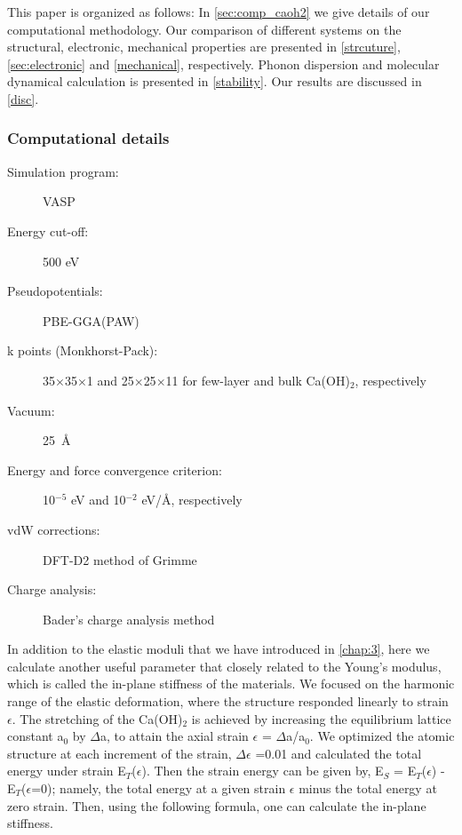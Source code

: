 This paper is organized as follows: In \autoref{sec:comp_caoh2} we 
give details of our computational methodology. Our comparison of different systems on the structural, electronic, mechanical properties are presented in \autoref{strcuture}, \autoref{sec:electronic} and \autoref{mechanical}, respectively.  Phonon dispersion and molecular dynamical calculation is presented in \autoref{stability}. Our results are discussed in \autoref{disc}.

               


\subsubsection{Computational details}

\begin{footnotesize}
\begin{description}
\item[Simulation program:] VASP
\item[Energy cut-off:] 500 eV
\item[Pseudopotentials:] PBE-GGA(PAW)
\item[k points (Monkhorst-Pack):] 35$\times$35$\times$1 and 25$\times$25$\times$11 for few-layer and bulk Ca(OH)$_{2}$, respectively 
\item[Vacuum:] 25~\AA
\item[Energy and force convergence criterion:] 10$^{-5}$ eV and 10$^{-2}$ eV/\AA, respectively
\item[vdW corrections:] DFT-D2 method of Grimme \cite{Grimme}
\item[Charge analysis:] Bader's charge analysis method\cite{Bader1,Bader2,Bader3}
\end{description}
\end{footnotesize}


In addition to the elastic moduli that we have introduced in \autoref{chap:3}, here we calculate another useful parameter that closely related to the Young's modulus, which is called the in-plane stiffness of the materials. We 
focused on the harmonic range of the elastic deformation, where the structure 
responded linearly to strain $\epsilon$. The stretching of the Ca(OH)$_{2}$ is 
achieved by increasing the equilibrium lattice constant a$_{0}$ by $\Delta$a, 
to attain the axial strain $\epsilon$ = $\Delta$a/a$_{0}$. We optimized the 
atomic structure at each increment of the strain, $\Delta\epsilon$ =0.01 and 
calculated the total energy under strain E$_{T}$($\epsilon$). Then the strain 
energy can be given by, E$_{S}$ = E$_{T}$($\epsilon$) - E$_{T}$($\epsilon$=0); 
namely, the total energy at a given strain $\epsilon$ minus the total energy at 
zero strain. Then, using the following formula, one can calculate the in-plane 
stiffness. 

